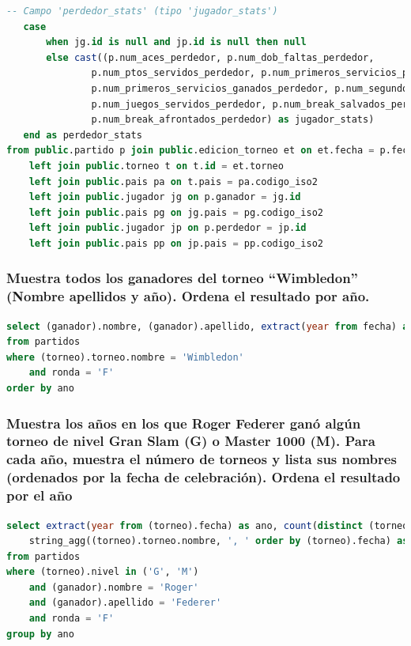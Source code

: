 \documentclass[10pt]{opticajnl}
\begin{document}
\begin{lstlisting}[language=SQL]
   -- Campo 'perdedor_stats' (tipo 'jugador_stats')
   case
       when jg.id is null and jp.id is null then null
       else cast((p.num_aces_perdedor, p.num_dob_faltas_perdedor,
           	   p.num_ptos_servidos_perdedor, p.num_primeros_servicios_perdedor,
           	   p.num_primeros_servicios_ganados_perdedor, p.num_segundos_servicios_ganados_perdedor,
           	   p.num_juegos_servidos_perdedor, p.num_break_salvados_perdedor,
           	   p.num_break_afrontados_perdedor) as jugador_stats)
   end as perdedor_stats
from public.partido p join public.edicion_torneo et on et.fecha = p.fecha and et.torneo = p.torneo 
	left join public.torneo t on t.id = et.torneo
	left join public.pais pa on t.pais = pa.codigo_iso2
	left join public.jugador jg on p.ganador = jg.id
	left join public.pais pg on jg.pais = pg.codigo_iso2
	left join public.jugador jp on p.perdedor = jp.id
	left join public.pais pp on jp.pais = pp.codigo_iso2
\end{lstlisting}





\subsubsection{Muestra todos los ganadores del torneo ``Wimbledon'' (Nombre apellidos y año). Ordena el resultado por año.}

\begin{lstlisting}[language=SQL]
select (ganador).nombre, (ganador).apellido, extract(year from fecha) as ano
from partidos
where (torneo).torneo.nombre = 'Wimbledon'
	and ronda = 'F'
order by ano
\end{lstlisting}





\subsubsection{Muestra los años en los que Roger Federer ganó algún torneo de nivel Gran Slam (G) o Master 1000 (M). Para cada año, muestra el número de torneos y lista sus nombres (ordenados por la fecha de celebración). Ordena el resultado por el año}

\begin{lstlisting}[language=SQL]
select extract(year from (torneo).fecha) as ano, count(distinct (torneo).torneo.id) as numero_torneos, 
	string_agg((torneo).torneo.nombre, ', ' order by (torneo).fecha) as torneos
from partidos
where (torneo).nivel in ('G', 'M')
	and (ganador).nombre = 'Roger'
	and (ganador).apellido = 'Federer'
	and ronda = 'F'
group by ano
\end{lstlisting}
\end{document}
